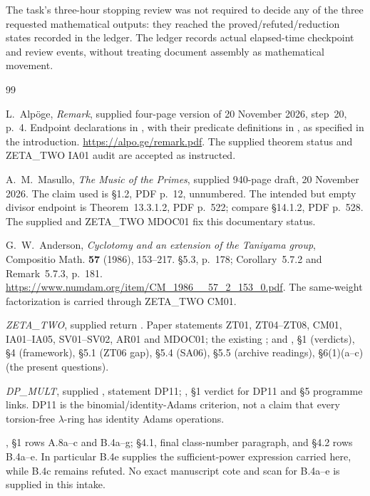 \documentclass[11pt]{article}
\theoremstyle{remark}
\begin{document}
The task's three-hour stopping review was not required to decide any
of the three requested mathematical outputs: they reached the
proved/refuted/reduction states recorded in the ledger.
The ledger records actual elapsed-time checkpoint and review events,
without treating document assembly as mathematical movement.

\clearpage
\begin{thebibliography}{99}


L.~Alp\"oge, \emph{Remark}, supplied four-page version of
20 November 2026, step~20, p.~4.  Endpoint declarations in
, with their predicate definitions in
, as specified in the introduction.
\url{https://alpo.ge/remark.pdf}.  The supplied theorem status and
ZETA\_TWO IA01 audit are accepted as instructed.

A.~M.~Masullo, \emph{The Music of the Primes}, supplied 940-page
draft, 20 November 2026.  The claim used is \S1.2, PDF p.~12,
unnumbered.  The intended but empty divisor endpoint is
Theorem~13.3.1.2, PDF p.~522; compare \S14.1.2, PDF p.~528.
The supplied  and ZETA\_TWO
MDOC01 fix this documentary status.

G.~W.~Anderson, \emph{Cyclotomy and an extension of the Taniyama
group}, Compositio Math. \textbf{57} (1986), 153--217.
\S5.3, p.~178; Corollary~5.7.2 and Remark~5.7.3, p.~181.
\url{https://www.numdam.org/item/CM_1986__57_2_153_0.pdf}.
The same-weight factorization is carried through ZETA\_TWO CM01.

\emph{ZETA\_TWO}, supplied return
.
Paper statements ZT01, ZT04--ZT08, CM01, IA01--IA05,
SV01--SV02, AR01 and MDOC01; the existing
; and
,
\S1 (verdicts), \S4 (framework), \S5.1 (ZT06 gap),
\S5.4 (SA06), \S5.5 (archive readings), \S6(1)(a--c)
(the present questions).

\emph{DP\_MULT}, supplied
,
statement DP11; ,
\S1 verdict for DP11 and \S5 programme links.
DP11 is the binomial/identity-Adams criterion, not a claim that
every torsion-free $\lambda$-ring has identity Adams operations.

, \S1 rows
A.8a--c and B.4a--g; \S4.1, final class-number paragraph,
and \S4.2 rows B.4a--e.  In particular B.4e supplies the
sufficient-power expression carried here, while B.4c remains
refuted.  No exact manuscript cote and scan for B.4a--e
is supplied in this intake.


\end{thebibliography}
\end{document}
